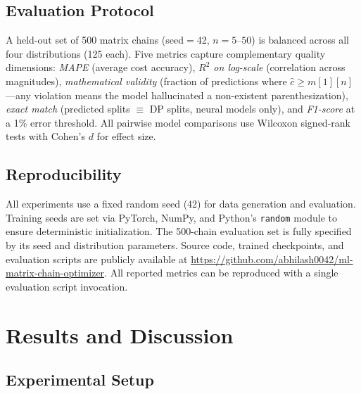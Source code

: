 \documentclass[conference]{IEEEtran}
\begin{document}
\subsection{Evaluation Protocol}
\label{sec:evalprotocol}

A held-out set of 500 matrix chains (seed${=}$42, $n{=}5$--$50$) is balanced across all four distributions (125 each). Five metrics capture complementary quality dimensions: \emph{MAPE} (average cost accuracy), \emph{$R^2$ on log-scale} (correlation across magnitudes), \emph{mathematical validity} (fraction of predictions where $\hat{c} \geq m[1][n]$---any violation means the model hallucinated a non-existent parenthesization), \emph{exact match} (predicted splits $\equiv$ DP splits, neural models only), and \emph{F1-score} at a 1\% error threshold. All pairwise model comparisons use Wilcoxon signed-rank tests with Cohen's $d$ for effect size.

\subsection{Reproducibility}
\label{sec:reproducibility}
All experiments use a fixed random seed (42) for data generation and evaluation. Training seeds are set via PyTorch, NumPy, and Python's \texttt{random} module to ensure deterministic initialization. The 500-chain evaluation set is fully specified by its seed and distribution parameters. Source code, trained checkpoints, and evaluation scripts are publicly available at \url{https://github.com/abhilash0042/ml-matrix-chain-optimizer}. All reported metrics can be reproduced with a single evaluation script invocation.


\section{Results and Discussion}

\subsection{Experimental Setup}
\label{sec:setup}
\end{document}
